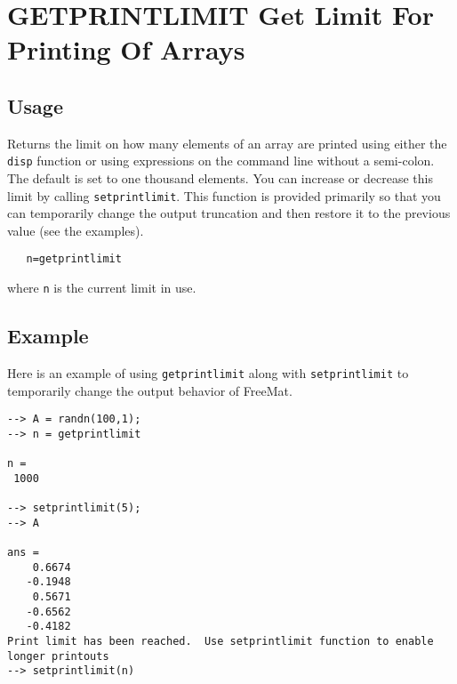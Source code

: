 \section{GETPRINTLIMIT Get Limit For Printing Of Arrays}

\subsection{Usage}

Returns the limit on how many elements of an array are printed
using either the \verb|disp| function or using expressions on the
command line without a semi-colon.  The default is set to 
one thousand elements.  You can increase or decrease this
limit by calling \verb|setprintlimit|.  This function is provided
primarily so that you can temporarily change the output truncation
and then restore it to the previous value (see the examples).
\begin{verbatim}
   n=getprintlimit
\end{verbatim}
where \verb|n| is the current limit in use.
\subsection{Example}

Here is an example of using \verb|getprintlimit| along with \verb|setprintlimit| to temporarily change the output behavior of FreeMat.
\begin{verbatim}
--> A = randn(100,1);
--> n = getprintlimit

n = 
 1000 

--> setprintlimit(5);
--> A

ans = 
    0.6674 
   -0.1948 
    0.5671 
   -0.6562 
   -0.4182
Print limit has been reached.  Use setprintlimit function to enable longer printouts
--> setprintlimit(n)
\end{verbatim}
